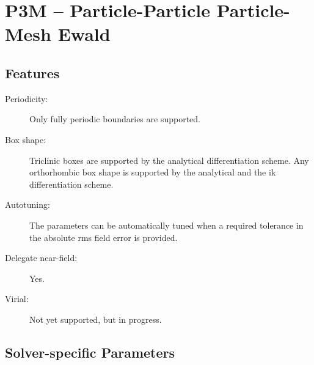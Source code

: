 \chapter{P3M -- Particle-Particle Particle-Mesh Ewald}
\label{cha:p3m}


\section{Features}

\begin{description}
\item[Periodicity:] Only fully periodic boundaries are supported.
\item[Box shape:] Triclinic boxes are supported by the analytical differentiation scheme. Any orthorhombic box shape is supported by the analytical and the ik differentiation scheme. 
\item[Autotuning:] The parameters can be automatically tuned when a
  required tolerance in the absolute rms field error is provided.
\item[Delegate near-field:] Yes.
\item[Virial:] Not yet supported, but in progress.
\end{description}

\section{Solver-specific Parameters}

